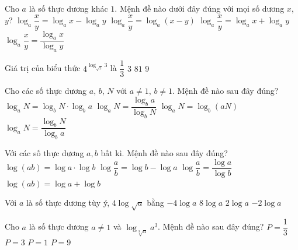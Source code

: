 \begin{ex}%
	Cho $a$ là số  thực dương khác $1$. Mệnh đề nào dưới đây đúng với mọi số dương $x$, $y$?
	 \choice
		{\True  $\log_a\dfrac{x}{y}=\log_ax-\log_ay$}
		 {$\log_a\dfrac{x}{y}=\log_a(x-y)$}
		{$\log_a\dfrac{x}{y}=\log_ax+\log_ay$} 
		{$\log_a\dfrac{x}{y}=\dfrac{\log_ax}{\log_ay}$} 
\end{ex}

\begin{ex}%
	Giá trị của biểu thức  $4^{\log_{\sqrt{2}} 3}$ là
	\choice 
		{$\dfrac{1}{3}$} 
		{$  3 $}
		{\True $ 81 $} 
		{$ 9 $} 
\end{ex}

\begin{ex}%
	Cho các số thực dương $a$,  $b$, $N$ với $a\ne 1$, $b\ne 1$. Mệnh đề nào sau đây đúng?
	\choice 
		{$\log_a N=\log _b N \cdot \log_b  a$}
		{$\log_a N=\dfrac{\log_b a}{\log_b N}$} 
		 {$\log_a N=\log_b(aN)$}
		{\True $\log_a N=\dfrac{\log_b N}{\log_b a}$} 
\end{ex}

\begin{ex}%
	Với các số thực dương $a, b$  bất kì. Mệnh đề nào sau đây đúng?
	 \choice
		{$\log (a b)=\log  a \cdot \log b$}
		{$\log \dfrac{a}{b}=\log b-\log a$} 
		{$\log \dfrac{a}{b}=\dfrac{\log a}{\log  b}$}
		{\True $\log (a b)=\log a+\log b$} 
\end{ex}

\begin{ex}%
	 Với $a$ là số thực dương tùy ý, $4\log \sqrt{a}$ bằng
	 \choice
		{$-4\log a$} 
		 {$8\log a$}
		 {\True $2\log a$}
		{$-2\log  a$}
\end{ex}

\begin{ex}%
	Cho  $a$ là số thực dương $a\ne 1$ và $\log _{\sqrt[3]{a}} a^3$. Mệnh đề nào sau đây đúng?
	\choice 
		{$P=\dfrac{1}{3}$} 
		 {$P=3$}
		{$P=1$} 
		{\True $P=9$} 
\end{ex}

